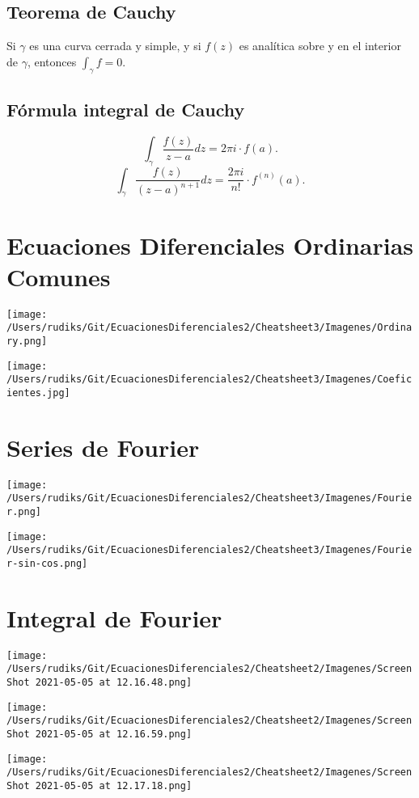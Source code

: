 \subsection{Teorema de Cauchy}

Si $\gamma$ es una curva cerrada y simple, y si $f(z)$ es analítica sobre y en el interior de $\gamma$, entonces $\int_\gamma f=0$. 

\subsection{Fórmula integral de Cauchy}

$$\int_\gamma \frac{f(z)}{z-a}dz=2\pi i \cdot f(a). $$
$$\int_\gamma \frac{f(z)}{(z-a)^{n+1}}dz=\frac{2\pi i}{n!} \cdot f^{(n)}(a). $$

\section{Ecuaciones Diferenciales Ordinarias Comunes}
\begin{center}
	\texttt{[image: /Users/rudiks/Git/EcuacionesDiferenciales2/Cheatsheet3/Imagenes/Ordinary.png]}
\end{center}

\begin{center}
	\texttt{[image: /Users/rudiks/Git/EcuacionesDiferenciales2/Cheatsheet3/Imagenes/Coeficientes.jpg]}
\end{center}

\section{Series de Fourier}

\begin{center}
	\texttt{[image: /Users/rudiks/Git/EcuacionesDiferenciales2/Cheatsheet3/Imagenes/Fourier.png]}
\end{center}

\begin{center}
	\texttt{[image: /Users/rudiks/Git/EcuacionesDiferenciales2/Cheatsheet3/Imagenes/Fourier-sin-cos.png]}
\end{center}

\newpage 

\section{Integral de Fourier}

\begin{center}
	\texttt{[image: /Users/rudiks/Git/EcuacionesDiferenciales2/Cheatsheet2/Imagenes/Screen Shot 2021-05-05 at 12.16.48.png]}
\end{center}
\begin{center}
	\texttt{[image: /Users/rudiks/Git/EcuacionesDiferenciales2/Cheatsheet2/Imagenes/Screen Shot 2021-05-05 at 12.16.59.png]}
\end{center}
\begin{center}
	\texttt{[image: /Users/rudiks/Git/EcuacionesDiferenciales2/Cheatsheet2/Imagenes/Screen Shot 2021-05-05 at 12.17.18.png]}
\end{center}

